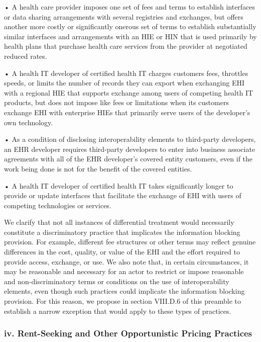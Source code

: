 \documentclass[twoside,11pt]{article}
\begin{document}
          • A health care provider imposes one set of fees and terms to establish interfaces or data sharing arrangements with several registries and exchanges, but offers another more costly or significantly onerous set of terms to establish substantially similar interfaces and arrangements with an HIE or HIN that is used primarily by health plans that purchase health care services from the provider at negotiated reduced rates.


          • A health IT developer of certified health IT charges customers fees, throttles speeds, or limits the number of records they can export when exchanging EHI with a regional HIE that supports exchange among users of competing health IT products, but does not impose like fees or limitations when its customers exchange EHI with enterprise HIEs that primarily serve users of the developer's own technology.


          • As a condition of disclosing interoperability elements to third-party developers, an EHR developer requires third-party developers to enter into business associate agreements with all of the EHR developer's covered entity customers, even if the work being done is not for the benefit of the covered entities.


          • A health IT developer of certified health IT takes significantly longer to provide or update interfaces that facilitate the exchange of EHI with users of competing technologies or services.


          We clarify that not all instances of differential treatment would necessarily constitute a discriminatory practice that implicates the information blocking provision. For example, different fee structures or other terms may reflect genuine differences in the cost, quality, or value of the EHI and the effort required to provide access, exchange, or use. We also note that, in certain circumstances, it may be reasonable and necessary for an actor to restrict or impose reasonable and non-discriminatory terms or conditions on the use of interoperability elements, even though such practices could implicate the information blocking provision. For this reason, we propose in section VIII.D.6 of this preamble to establish a narrow exception that would apply to these types of practices.


          \subsubsection{iv. Rent-Seeking and Other Opportunistic Pricing Practices}
\end{document}

